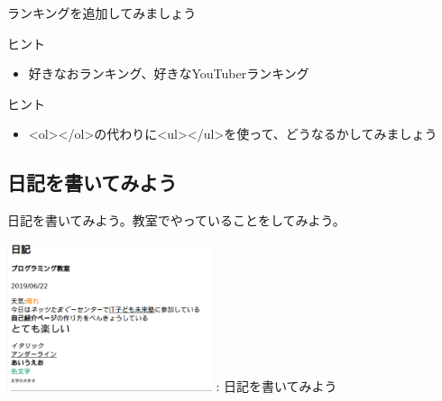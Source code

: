 \documentclass[a4paper,12pt]{jarticle}
\begin{document}
\bigskip


\bigskip


\bigskip


\theQuestion\label{Q:hasAnswer04-6}

ランキングを追加してみましょう

ヒント

\begin{itemize}
  \item
        好きなおランキング、好きなYouTuberランキング
\end{itemize}


\bigskip

\bigskip

\theQuestion\label{Q:hasAnswer04-7}

ヒント

\begin{itemize}
  \item
        {\textless}ol{\textgreater}{\textless}/ol{\textgreater}の代わりに{\textless}ul{\textgreater}{\textless}/ul{\textgreater}を使って、どうなるかしてみましょう
\end{itemize}



\bigskip

\clearpage
{}
\subsection{\theExercise 日記を書いてみよう}
\addtocounter{Exercise}{-1}\label{E:HTML_6}
日記を書いてみよう。教室でやっていることをしてみよう。

\centering
\begin{minipage}{6.32cm}
  {\upshape
    \includegraphics[width=0.45\textwidth]{textbook-img185.png}
    \newline
    : 日記を書いてみよう}
\end{minipage}
\end{document}
